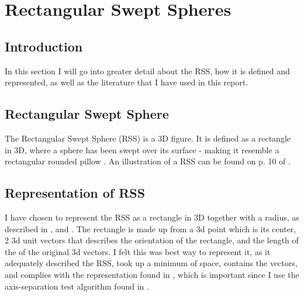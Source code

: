 
\section{Rectangular Swept Spheres}
\label{rss}

\subsection{Introduction}
In this section I will go into greater detail about the RSS, how it is defined and represented, as well as the literature that I have used in this report.

\subsection{Rectangular Swept Sphere}
The Rectangular Swept Sphere (RSS) is a 3D figure. It is defined as a rectangle in 3D, where a sphere has been swept over its surface - making it resemble a rectangular rounded pillow . An illustration of a RSS can be found on p. 10 of \cite{Larsen99fastproximity}. 

\subsection{Representation of RSS}
I have chosen to represent the RSS as a rectangle in 3D together with a radius, as described in \cite{larsen00fast}, \cite{Larsen99fastproximity} and \cite{237244}. The rectangle is made up from a 3d point which is its center, 2 3d unit vectors that describes the orientation  of the rectangle, and the length of the of the original 3d vectors. I felt this was best way to represent it, as it adequately described the RSS, took up a minimum of space, contains the vectors, and complies with the representation found in \cite{237244}, which is important since I use the axis-separation test algorithm found in \cite{237244}.


